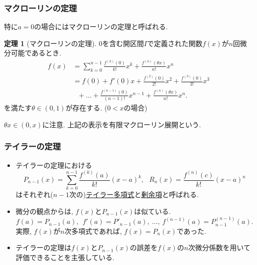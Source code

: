 \documentclass[dvipdfmx,cjk,10.2pt]{beamer}
\theoremstyle{definition}
\newtheorem{Thm}{定理}[section]
\begin{document}
\begin{frame}
\frametitle{マクローリンの定理}


特に$a=0$の場合にはマクローリンの定理と呼ばれる. 


\begin{Thm}[マクローリンの定理]  \label{マクローリン}
$0$を含む開区間$I$で定義された関数$f(x)$が$n$回微分可能であるとき. 
 \begin{align*}
f(x) & = \sum_{k=0}^{n-1}\frac{f^{(k)}(0)}{k!}x^k + \frac{f^{(n)}(\theta x)}{n!}x^n \\
& =  f(0)+ f'(0)x + \frac{f^{(2)}(0)}{2!}x^2  + \frac{f^{(3)}(0)}{3!}x^3 \\
& \ \ \ + \dots + \frac{f^{(n-1)}(0)}{(n-1)!}x^{n-1}+\frac{f^{(n)}(\theta x)}{n!}x^n . 
\end{align*}
を満たす$\theta \in (0,1)$が存在する. ($0<x$の場合) 
\end{Thm}
$\theta x \in (0,x)$に注意. 上記の表示を有限マクローリン展開という.

\end{frame}







\begin{frame}
\frametitle{テイラーの定理}


\begin{itemize}
\item テイラーの定理における
$$
P_{n-1}(x)=\sum_{k=0}^{n-1}\frac{f^{(k)}(a)}{k!}(x-a)^k, \ \ \ 
R_n(x)=\frac{f^{(n)}(c)}{k!}(x-a)^n
$$
はそれぞれ($n-1$次の)\underline{テイラー多項式}と\underline{剰余項}と呼ばれる. 
\item 微分の観点からは, $f(x)$と$P_{n-1}(x)$は似ている. 
$$
f(a)=P_{n-1}(a), \ \ f '(a)=P'_{n-1}(a), \ \dots, \  f^{(n-1)}(a)=P^{(n-1)}_{n-1}(a). 
$$
実際, $f(x)$が$n$次多項式であれば, $f(x)=P_n(x)$であった. 
\item テイラーの定理は$f(x)$と$P_{n-1}(x)$の誤差を$f(x)$の$n$次微分係数を用いて評価できることを主張している. 
\end{itemize}

\end{frame}
\end{document}

